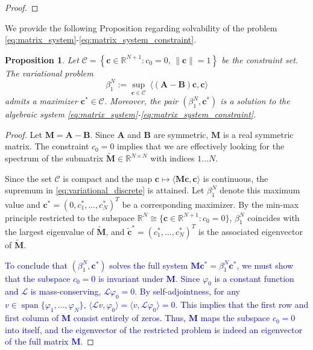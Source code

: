 \documentclass[12pt, a4paper]{article}
\newcommand{\revision}[1]{\textcolor{blue}{#1}}
\theoremstyle{break}
\theoremstyle{break}
\newtheorem{prp}{Proposition}[section]
\theoremstyle{break}
\theoremstyle{break}
\theoremstyle{break}
\theoremstyle{break}
\theoremstyle{break}
\theoremstyle{break}
\theoremstyle{break}
\begin{document}
\begin{proof}
\end{proof}

We provide the following Proposition regarding solvability of the problem \eqref{eq:matrix_system}-\eqref{eq:matrix_system_constraint}.
\begin{prp}
    \label{prp:finite_dimensional_minimizer}
    Let $\mathcal{C} = \left\{ \mathbf{c} \in \mathbb{R}^{N+1} : c_0 = 0, \, \|\mathbf{c}\| = 1 \right\}$ be the constraint set. 
    The variational problem
    \begin{equation}
        \label{eq:variational_discrete}
        \beta_1^N := \sup_{\mathbf{c} \in \mathcal{C}} \: \langle (\mathbf{A} - \mathbf{B}) \mathbf{c}, \mathbf{c} \rangle
    \end{equation}
    admits a maximizer $\mathbf{c}^* \in \mathcal{C}$. Moreover, the pair $(\beta_1^N, \mathbf{c}^*)$ is a solution to the algebraic system \eqref{eq:matrix_system}-\eqref{eq:matrix_system_constraint}.
\end{prp}

\begin{proof}
    Let $\mathbf{M} = \mathbf{A} - \mathbf{B}$. Since $\mathbf{A}$ and $\mathbf{B}$ are symmetric, $\mathbf{M}$ is a real symmetric matrix. The constraint $c_0=0$ implies that we are effectively looking for the spectrum of the submatrix $\tilde{\mathbf{M}} \in \mathbb{R}^{N \times N}$ with indices $1 \dots N$.
    
    Since the set $\mathcal{C}$ is compact and the map $\mathbf{c} \mapsto \langle \mathbf{M}\mathbf{c}, \mathbf{c}\rangle$ is continuous, the supremum in \eqref{eq:variational_discrete} is attained. Let $\beta_1^N$ denote this maximum value and $\mathbf{c}^* = (0, c_1^*, \dots, c_N^*)^T$ be a corresponding maximizer. By the min-max principle restricted to the subspace $\mathbb{R}^N \cong \{ \mathbf{c} \in \mathbb{R}^{N+1} : c_0=0 \}$, $\beta_1^N$ coincides with the largest eigenvalue of $\tilde{\mathbf{M}}$, and $\tilde{\mathbf{c}}^* = (c_1^*, \dots, c_N^*)^T$ is the associated eigenvector of $\tilde{\mathbf{M}}$. 
    
    \revision{To conclude that $(\beta_1^N, \mathbf{c}^*)$ solves the full system $\mathbf{M}\mathbf{c}^* = \beta_1^N \mathbf{c}^*$, we must show that the subspace $c_0 = 0$ is invariant under $\mathbf{M}$. Since $\varphi_0$ is a constant function and $\mathcal{L}$ is mass-conserving, $\mathcal{L}\varphi_0 = 0$. By self-adjointness, for any $v \in \operatorname{span}\{\varphi_1, \dots, \varphi_N\}$, $\langle \mathcal{L}v, \varphi_0 \rangle = \langle v, \mathcal{L}\varphi_0 \rangle = 0$. This implies that the first row and first column of $\mathbf{M}$ consist entirely of zeros. Thus, $\mathbf{M}$ maps the subspace $c_0 = 0$ into itself, and the eigenvector of the restricted problem is indeed an eigenvector of the full matrix $\mathbf{M}$.}
\end{proof}
\end{document}
